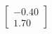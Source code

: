 \documentclass[preview]{standalone}
\begin{document}
\begin{align*}
\begin{bmatrix} -0.40 \\ 1.70 \end{bmatrix}
\end{align*}
\end{document}
